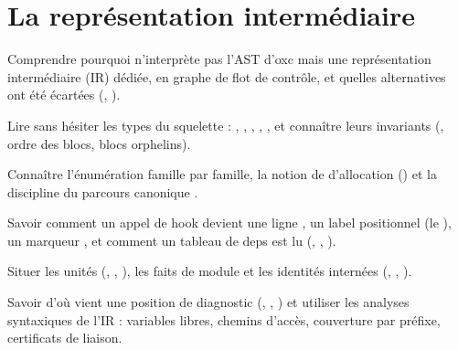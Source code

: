 \chapter{La représentation intermédiaire}
\label{chap:ir}

\begin{objectifs}
  \item Comprendre pourquoi \reactant{} n'interprète pas l'AST d'oxc mais une représentation intermédiaire (IR) dédiée, en graphe de flot de contrôle, et quelles alternatives ont été écartées (, ).
  \item Lire sans hésiter les types du squelette : , , , , , et connaître leurs invariants (, ordre des blocs, blocs orphelins).
  \item Connaître l'énumération  famille par famille, la notion de  d'allocation () et la discipline du parcours canonique .
  \item Savoir comment un appel de hook devient une ligne , un label positionnel (le ), un marqueur , et comment un tableau de deps est lu (, , ).
  \item Situer les unités (, , ), les faits de module et les identités internées (, , ).
  \item Savoir d'où vient une position de diagnostic (, , ) et utiliser les analyses syntaxiques de l'IR : variables libres, chemins d'accès, couverture par préfixe, certificats de liaison.
\end{objectifs}


